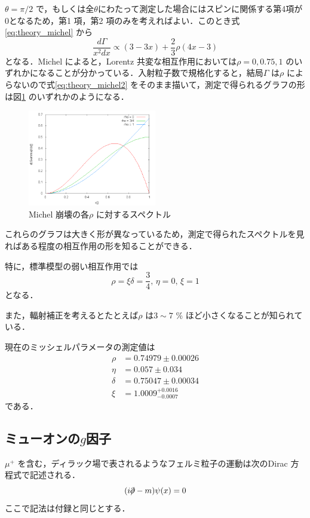 	$\theta = \pi/2$ で，もしくは全$\theta$にわたって測定した場合にはスピンに関係する第4項が0となるため，第1 項，第2 項のみを考えればよい．このとき式\eqref{eq:theory_michel} から
	\begin{equation}
	\frac{d\Gamma}{x^{2}dx} \propto (3 - 3x) + \frac{2}{3}\rho (4x - 3)
	\label{eq:theory_michel2}
	\end{equation}
	となる．Michel \cite{michel_origin}
によると，Lorentz 共変な相互作用においては$\rho = 0, 0.75, 1$ のいずれかになることが分かっている．\cite{micher_interaction}入射粒子数で規格化すると，結局$\Gamma$ は$\rho$ によらないので式\eqref{eq:theory_michel2} をそのまま描いて，測定で得られるグラフの形は図\ref{zu:michelpar} のいずれかのようになる．

	\begin{figure}[htbp]
	\centering
	\includegraphics[width = 0.5\textwidth]{figure/abe/michelgraph.png}
	\caption{Michel 崩壊の各$\rho$ に対するスペクトル}
	\label{zu:michelpar}
	\end{figure}
	これらのグラフは大きく形が異なっているため，測定で得られたスペクトルを見ればある程度の相互作用の形を知ることができる．

	特に，標準模型の弱い相互作用では%
	\[ \rho = \xi\delta = \frac{3}{4},\, \eta = 0,\, \xi = 1 \]
	となる．

	また，輻射補正を考えるとたとえば$\rho$ は$3 \sim 7$ \% ほど小さくなることが知られている．

	現在のミッシェルパラメータの測定値は
	\begin{align*}
	\rho &= 0.74979 \pm 0.00026\\
	\eta &= 0.057 \pm 0.034\\
	\delta &= 0.75047 \pm 0.00034\\
	\xi &= 1.0009^{+0.0016}_{-0.0007}
	\end{align*}
	である．\cite{PDG}
	
	\subsection{ミューオンの$g$因子}
	$\mu^{+}$ を含む，ディラック場で表されるようなフェルミ粒子の運動は次のDirac 方程式で記述される．
	\begin{equation}
	(i\Slash{\partial} - m)\psi(x) = 0
	\label{eq:theory_dirac}
	\end{equation}
        ここで記法は付録と同じとする．

